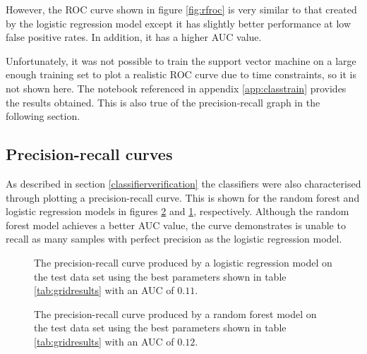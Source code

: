 However, the ROC curve shown in figure \ref{fig:rfroc} is very similar to that created by the logistic regression model except it has slightly better performance at low false positive rates.
In addition, it has a higher AUC value.

Unfortunately, it was not possible to train the support vector machine on a large enough training set to plot a realistic ROC curve due to time constraints, so it is not shown here.
The notebook referenced in appendix \ref{app:classtrain} provides the results obtained.
This is also true of the precision-recall graph in the following section.


\subsection{Precision-recall curves}

As described in section \ref{classifierverification} the classifiers were also characterised through plotting a precision-recall curve.
This is shown for the random forest and logistic regression models in figures \ref{fig:rfpr} and \ref{fig:logpr}, respectively.
Although the random forest model achieves a better AUC value, the curve demonstrates is unable to recall as many samples with perfect precision as the logistic regression model.

\begin{figure}
    \centering
    \setlength\figureheight{3in}
    \setlength\figurewidth{4in}
    \caption{The precision-recall curve produced by a logistic regression model on the test data set using the best parameters shown in table \ref{tab:gridresults} with an AUC of $0.11$.}
    \label{fig:logpr}
\end{figure}

\begin{figure}
    \centering
    \setlength\figureheight{3in}
    \setlength\figurewidth{4in}
    \caption{The precision-recall curve produced by a random forest model on the test data set using the best parameters shown in table \ref{tab:gridresults} with an AUC of $0.12$.}
    \label{fig:rfpr}
\end{figure}

